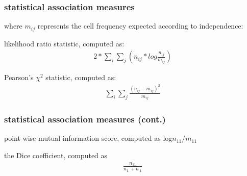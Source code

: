 \documentclass[11pt,handout]{beamer}
\begin{document}
\begin{frame}
 \frametitle{statistical association measures}
 where $m_{ij}$ represents the cell frequency expected according to independence:
 \vspace*{1em}
 \begin{description}
  \setlength{\itemsep}{2em}
  \item[$G^2$] likelihood ratio statistic, computed as:
  \begin{align}
   2 * \sum_i \sum_j ( n_{ij} * log \frac{n_{ij}}{m_{ij}} )
  \end{align}

  \item[$\chi^2$] Pearson's $\chi^2$ statistic, computed as:
  \begin{align}
   \sum_i \sum_j \frac{(n_{ij} - m_{ij})^2}{m_{ij}}
  \end{align}
 \end{description}
\end{frame}

\begin{frame}
 \frametitle{statistical association measures (cont.)}
 \begin{description}
  \setlength{\itemsep}{2em}
  \item[pmi] point-wise mutual information score, computed as log\@$n_{11}/m_{11}$
  \item[dice] the Dice coefficient, computed as
  \begin{align}
   \frac{n_{11}}{n_{1.} + n_{.1}}
  \end{align}
 \end{description}
\end{frame}



\end{document}
